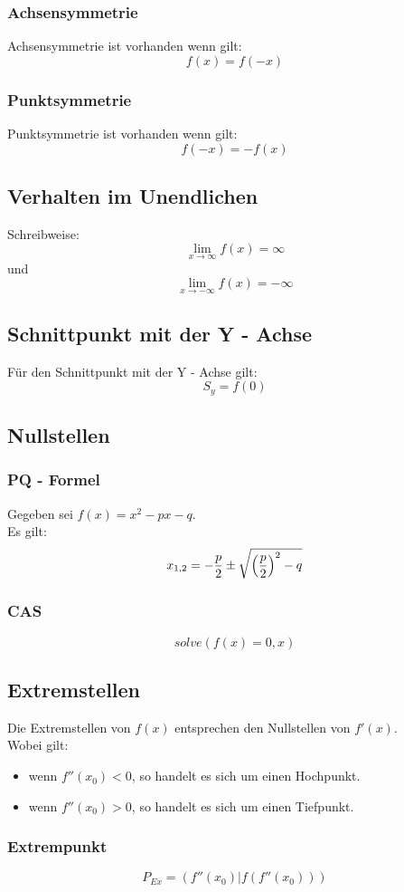 \documentclass[a4paper,12pt]{article}
\begin{document}
\subsubsection{Achsensymmetrie}
Achsensymmetrie ist vorhanden wenn gilt:
$$f(x) = f(-x)$$
\subsubsection{Punktsymmetrie}
Punktsymmetrie ist vorhanden wenn gilt:
$$f(-x) = -f(x)$$
\subsection{Verhalten im Unendlichen}
Schreibweise:
\[\lim_{x \to \infty} f(x) = \infty\]
und
\[\lim_{x \to -\infty} f(x) = -\infty\]
\subsection{Schnittpunkt mit der Y - Achse}
Für den Schnittpunkt mit der Y - Achse gilt:
$$S_y = f(0)$$
\subsection{Nullstellen}
\subsubsection{PQ - Formel}
Gegeben sei $f(x) = x^2 - px - q$.\\
Es gilt:
$$x_{1,2} = - \frac{p}{2} \pm \sqrt{\Big{(}\frac{p}{2}\Big{)}^2 - q}$$
\subsubsection{CAS}
$$solve(f(x) = 0, x)$$
\subsection{Extremstellen}
Die Extremstellen von $f(x)$ entsprechen den Nullstellen von $f'(x)$.\\
Wobei gilt:
\begin{itemize}
\item wenn $f''(x_0) < 0$, so handelt es sich um einen Hochpunkt.
\item wenn $f''(x_0) > 0$, so handelt es sich um einen Tiefpunkt.
\end{itemize}
\subsubsection{Extrempunkt}
$$P_{Ex} = (f''(x_0) | f(f''(x_0)))$$
\end{document}

